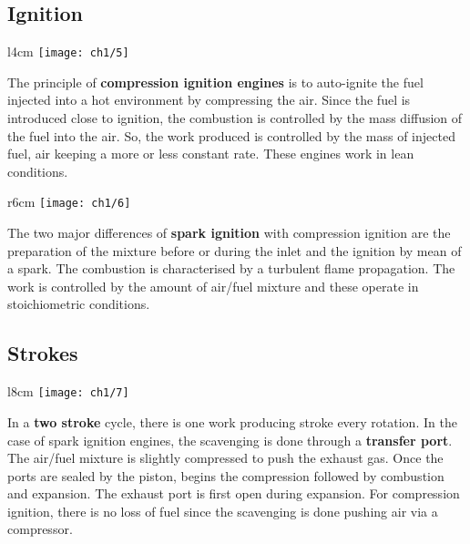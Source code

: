 	\subsection{Ignition}
		\begin{wrapfigure}[7]{l}{4cm}
		\vspace{-5mm}
		\texttt{[image: ch1/5]}
		\label{fig:1.5}
		\end{wrapfigure}
		The principle of \textbf{compression ignition engines} is to auto-ignite the fuel injected into a hot environment by compressing the air. Since the fuel is introduced close to ignition, the combustion is controlled by the mass diffusion of the fuel into the air. So, the work produced is controlled by the mass of injected fuel, air keeping a more or less constant rate. These engines work in lean conditions. 
		\ \\
		
		\begin{wrapfigure}[7]{r}{6cm}
		\vspace{-15mm}
		\texttt{[image: ch1/6]}
		\label{fig:1.6}
		\end{wrapfigure}
		The two major differences of \textbf{spark ignition} with compression ignition are the preparation of the mixture before or during the inlet and the ignition by mean of a spark. The combustion is characterised by a turbulent flame propagation. The work is controlled by the amount of air/fuel mixture and these operate in stoichiometric conditions. 
		
		\newpage
	\subsection{Strokes}
		\begin{wrapfigure}[12]{l}{8cm}
		\vspace{-5mm}
		\texttt{[image: ch1/7]}
		\label{fig:1.7}
		\end{wrapfigure}
		In a \textbf{two stroke} cycle, there is one work producing stroke every rotation. In the case of spark ignition engines, the scavenging is done through a \textbf{transfer port}. The air/fuel mixture is slightly compressed to push the exhaust gas. Once the ports are sealed by the piston, begins the compression followed by combustion and expansion. The exhaust port is first open during expansion. For compression ignition, there is no loss of fuel since the scavenging is done pushing air via a compressor.\\
		
